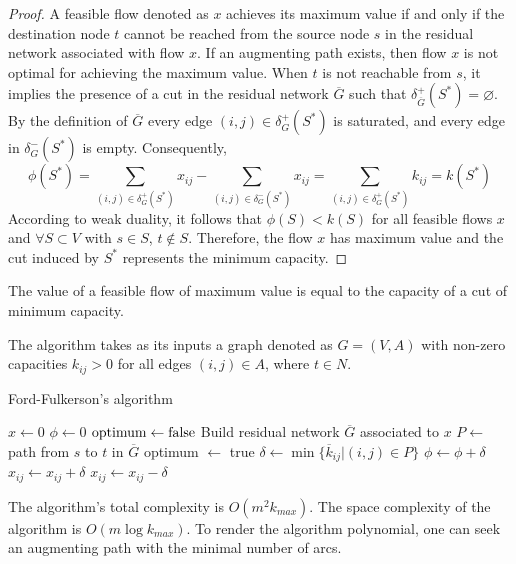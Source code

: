 \begin{proof}
    A feasible flow denoted as $x$  achieves its maximum value if and only if the destination node $t$ cannot be reached from the source node $s$ in the residual network associated with flow $x$. 
    If an augmenting path exists, then flow $x$ is not optimal for achieving the maximum value.
    When $t$ is not reachable from $s$, it implies the presence of a cut in the residual network $\overline{G}$ such that $\delta^{+}_{\overline{G}}(S^{*})=\varnothing$. 
    By the definition of $\overline{G}$  every edge $(i,j) \in \delta^{+}_{G}(S^{*})$ is saturated, and every edge in $\delta^{-}_{G}(S^{*})$ is empty. 
    Consequently,
    \[\phi(S^{*})=\sum_{(i,j) \in \delta^{+}_{G}(S^{*})}{x_{ij}}-\sum_{(i,j) \in \delta^{-}_{G}(S^{*})}{x_{ij}}= \sum_{(i,j) \in \delta^{+}_{G}(S^{*})}{k_{ij}}=k(S^{*})\]
    According to weak duality, it follows that $\phi(S) < k(S)$ for all feasible flows $x$ and $\forall S \subset V$ with $s \in S$, $t \notin S$. 
    Therefore, the flow $x$ has maximum value and the cut induced by $S^{*}$ represents the minimum capacity.
\end{proof}
\begin{theorem}
    The value of a feasible flow of maximum value is equal to the capacity of a cut of minimum capacity.
\end{theorem}

The algorithm takes as its inputs a graph denoted as $G=(V,A)$ with non-zero capacities $k_{ij}>0$ for all edges $(i,j) \in A$, where $t \in N$. 
\begin{algorithm}[H]
    \caption{Ford-Fulkerson's algorithm}
        \begin{algorithmic}[1]
            \State $x \leftarrow 0$
            \State $\phi \leftarrow 0$
            \State $\textnormal{optimum} \leftarrow \textnormal{false}$
                \State Build residual network $\overline{G}$ associated to $x$
                \State $P \leftarrow$ path from $s$ to $t$ in $\overline{G}$
                    \State optimum $\leftarrow$ true
                \Else
                    \State $\delta \leftarrow \min\{\overline{k}_{ij}|(i,j) \in P\}$
                    \State $\phi \leftarrow \phi + \delta$
                            \State $x_{ij} \leftarrow x_{ij}+\delta$
                        \Else 
                            \State $x_{ij} \leftarrow x_{ij}-\delta$
                        \EndIf
                    \EndFor
                \EndIf
            \EndWhile
        \end{algorithmic}
\end{algorithm}
The algorithm's total complexity is $O(m^2k_{max})$. 
The space complexity of the algorithm is $O(m\log{k_{max}})$. 
To render the algorithm polynomial, one can seek an augmenting path with the minimal number of arcs.

